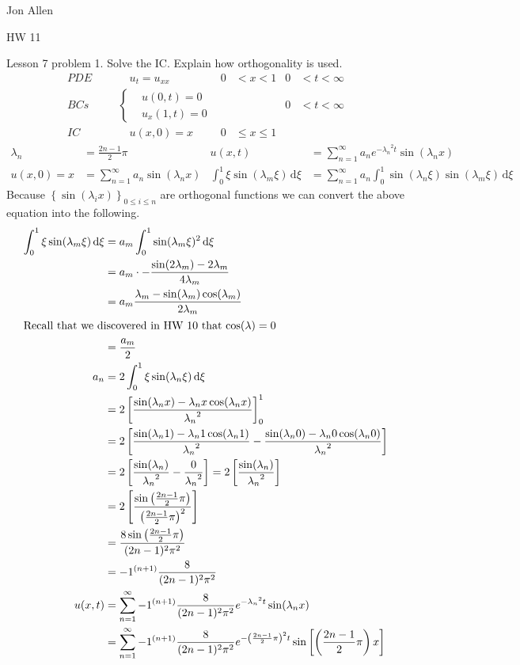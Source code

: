 \documentclass{article}
\begin{document}
Jon Allen

HW 11

Lesson 7 problem 1. Solve the IC. Explain how orthogonality is used.
\begin{align*}
  PDE&&&\quad u_t=u_{xx}&0&<x<1&0&<t<\infty\\
  BCs&&&\left\{
  \begin{aligned}
    &u(0,t)=0\\
    &u_x(1,t)=0
  \end{aligned}
  \right.&&&0&<t<\infty\\
  IC&&&\quad u(x,0)=x&0&\leq x\leq 1
\end{align*}
\begin{align*}
  \lambda_n&=\frac{2n-1}{2}\pi &
  u(x,t)&=\sum\limits_{n=1}^\infty{a_ne^{-{\lambda_n}^2t}\sin(\lambda_n x)}\\
  u(x,0)=x&=\sum\limits_{n=1}^\infty{a_n\sin(\lambda_n x)}&
  \int_0^1{\xi\sin(\lambda_m\xi)\,\mathrm{d}\xi}&=\sum\limits_{n=1}^\infty{a_n\int_0^1{\sin(\lambda_n\xi)\sin(\lambda_m\xi)\,\mathrm{d}\xi}}
\end{align*}
Because $\left\{\sin(\lambda_ix)\right\}_{0\leq i\leq n}$ are orthogonal functions we can convert the above equation into the following.
\begin{align*}
  \int_0^1{\xi\sin(\lambda_m\xi)\,\mathrm{d}\xi}&=a_m\int_0^1{\sin(\lambda_m\xi)^2\,\mathrm{d}\xi}\\
  &=a_m\cdot-\frac{\sin(2\lambda_m)-2\lambda_m}{4\lambda_m}\\
  &=a_m\frac{\lambda_m-\sin(\lambda_m)\cos(\lambda_m)}{2\lambda_m}\\
  \intertext{Recall that we discovered in HW 10 that $\cos(\lambda)=0$}
  &=\frac{a_m}{2}\\
  a_n&=2\int_0^1{\xi\sin(\lambda_n\xi)\,\mathrm{d}\xi}\\
  &=2\left[\frac{\sin(\lambda_nx)-\lambda_nx\cos(\lambda_nx)}{{\lambda_n}^2}\right]_0^1\\
  &=2\left[\frac{\sin(\lambda_n1)-\lambda_n1\cos(\lambda_n1)}{{\lambda_n}^2}-\frac{\sin(\lambda_n0)-\lambda_n0\cos(\lambda_n0)}{{\lambda_n}^2}\right]\\
  &=2\left[\frac{\sin(\lambda_n)}{{\lambda_n}^2}-\frac{0}{{\lambda_n}^2}\right]=2\left[\frac{\sin(\lambda_n)}{{\lambda_n}^2}\right]\\
  &=2\left[\frac{\sin\left(\frac{2n-1}{2}\pi\right)}{\left(\frac{2n-1}{2}\pi\right)^2}\right]\\
  &=\frac{8\sin\left(\frac{2n-1}{2}\pi\right)}{(2n-1)^2\pi^2}\\
  &=-1^{\left(n+1\right)}\frac{8}{(2n-1)^2\pi^2}\\
  u(x,t)&=\sum\limits_{n=1}^\infty{-1^{\left(n+1\right)}\frac{8}{(2n-1)^2\pi^2}e^{-{\lambda_n}^2t}\sin(\lambda_n x)}\\
  &=\sum\limits_{n=1}^\infty{-1^{\left(n+1\right)}\frac{8}{(2n-1)^2\pi^2}e^{-\left(\frac{2n-1}{2}\pi\right)^2t}\sin\left[\left(\frac{2n-1}{2}\pi\right) x\right]}\\
\end{align*}
\end{document}
